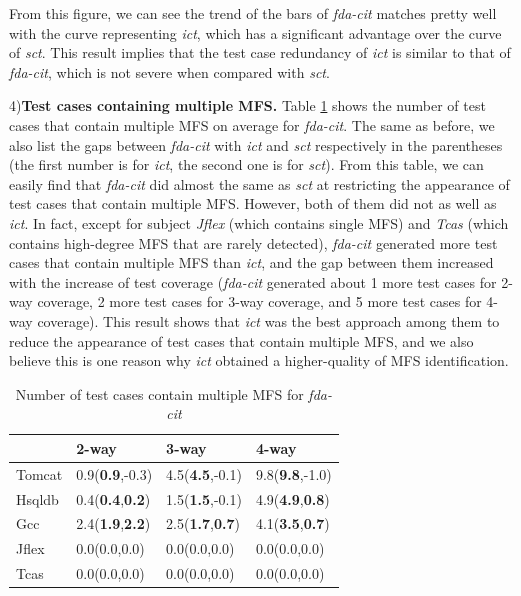 \documentclass[journal,12pt,onecolumn,draftclsnofoot,]{IEEEtran}
\begin{document}
From this figure, we can see the trend of the bars of \emph{fda-cit} matches pretty well with the curve representing \emph{ict}, which has a significant advantage over the curve of \emph{sct}. This result implies that the test case redundancy of \emph{ict} is similar to that of \emph{fda-cit}, which is not severe when compared with \emph{sct}.


4)\textbf{Test cases containing multiple MFS.}
Table \ref{multi-fda-cit} shows the number of test cases that contain multiple MFS on average for \emph{fda-cit}. The same as before, we also list the gaps between \emph{fda-cit} with \emph{ict} and \emph{sct} respectively in the parentheses (the first number is for \emph{ict}, the second one is for \emph{sct}). From this table, we can easily find that \emph{fda-cit} did almost the same as \emph{sct} at restricting the appearance of test cases that contain multiple MFS. However, both of them did not as well as \emph{ict}. In fact, except for subject \emph{Jflex} (which contains single MFS) and \emph{Tcas} (which contains high-degree MFS that are rarely detected), \emph{fda-cit} generated more test cases that contain multiple MFS than \emph{ict}, and the gap between them increased with the increase of test coverage (\emph{fda-cit} generated about 1 more test cases for 2-way coverage, 2 more test cases for 3-way coverage, and 5 more test cases for 4-way coverage). This result shows that \emph{ict} was the best approach among them to reduce the appearance of test cases that contain multiple MFS, and we also believe this is one reason why \emph{ict} obtained a higher-quality of MFS identification.


\begin{table}[ht]
\caption{Number of test cases contain multiple MFS for \emph{fda-cit}}
\label{multi-fda-cit}
\centering
    \begin{tabular}{|l|l|l|l|}
    \hline
                   & 2-way                    & 3-way                      & 4-way                       \\ \hline
Tomcat	&0.9(\textbf{0.9},-0.3)	&4.5(\textbf{4.5},-0.1)	&9.8(\textbf{9.8},-1.0)	\\
Hsqldb	&0.4(\textbf{0.4},\textbf{0.2})	&1.5(\textbf{1.5},-0.1)	&4.9(\textbf{4.9},\textbf{0.8})	\\
Gcc	&2.4(\textbf{1.9},\textbf{2.2})	&2.5(\textbf{1.7},\textbf{0.7})	&4.1(\textbf{3.5},\textbf{0.7})	\\
Jflex	&0.0(0.0,0.0)	&0.0(0.0,0.0)	&0.0(0.0,0.0)	\\
Tcas	&0.0(0.0,0.0)	&0.0(0.0,0.0)	&0.0(0.0,0.0)	\\\hline
    \end{tabular}
\end{table}
\end{document}
